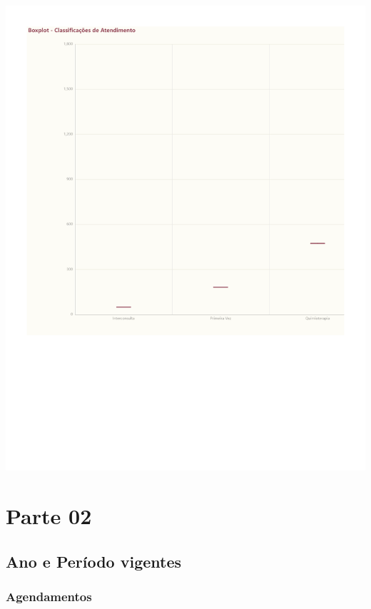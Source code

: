 \documentclass[
  letterpaper,
  DIV=11,
  numbers=noendperiod]{scrreprt}
\begin{document}
\includegraphics{2024_files/figure-pdf/unnamed-chunk-9-1.pdf}

\part{Parte 02}

\hypertarget{ano-e-peruxedodo-vigentes}{%
\chapter*{Ano e Período vigentes}\label{ano-e-peruxedodo-vigentes}}


\hypertarget{agendamentos-1}{%
\section*{Agendamentos}\label{agendamentos-1}}
\end{document}
